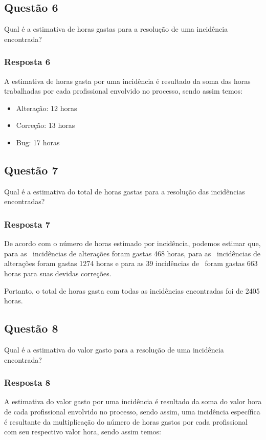 \documentclass[11pt, a4paper]{article}
\begin{document}
\subsection{Questão 6}\label{sec:questao-6}
Qual é a estimativa de horas gastas para a resolução de uma incidência encontrada?

\subsubsection{Resposta 6}
A estimativa de horas gasta por uma incidência é resultado da soma das horas trabalhadas por cada profissional envolvido no processo, sendo assim temos:

\begin{itemize}
	\item Alteração: 12 horas
	\item Correção: 13 horas
	\item Bug: 17 horas
\end{itemize}

\subsection{Questão 7}\label{sec:questao-7}
Qual é a estimativa do total de horas gastas para a resolução das incidências encontradas?

\subsubsection{Resposta 7}
De acordo com o número de horas estimado por incidência, podemos estimar que, para as \alteracoes~incidências de alterações foram gastas 468 horas, para as \correcoes~incidências de alterações foram gastas 1274 horas e para as 39 incidências de \bugs~foram gastas 663 horas para suas devidas correções.

Portanto, o total de horas gasta com todas as incidências encontradas foi de 2405 horas.

\subsection{Questão 8}\label{sec:questao-8}
Qual é a estimativa do valor gasto para a resolução de uma incidência encontrada?

\subsubsection{Resposta 8}
A estimativa do valor gasto por uma incidência é resultado da soma do valor hora de cada profissional envolvido no processo, sendo assim, uma incidência específica é resultante da multiplicação do número de horas gastos por cada profissional com seu respectivo valor hora, sendo assim temos:
\end{document}
